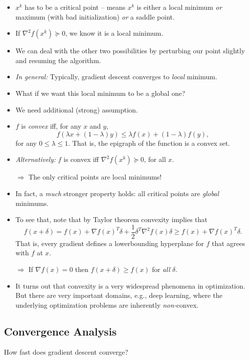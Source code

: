 \documentclass{article}
\begin{document}
\begin{itemize}
\item $x^k$ has to be a critical point -- means $x^k$ is either a local minimum {\em or} maximum (with bad initialization) {\em or} a saddle point. 
\item If $\nabla^2 f(x^k)\succeq 0$, we know it is a local minimum. 
\item We can deal with the other two possibilities by perturbing our point slightly and resuming the algorithm. 
\item {\em In general:} Typically, gradient descent converges to {\em local} minimum. 
\item What if we want this local minimum to be a global one?
\item We need additional (strong) assumption. 
\item $f$ is {\em convex} iff, for any $x$ and $y$, 
\[
f(\lambda x + (1-\lambda) y)\leq \lambda f(x) + (1-\lambda) f(y),
\]
for any $0\leq \lambda \leq 1$. That is, the epigraph of the function is a convex set. 
\item {\em Alternatively:} $f$ is convex iff $\nabla^2 f(x^k)\succeq 0$, for all $x$. 

$\Rightarrow$ The only critical points are local minimums!

\item In fact, a {\em much} stronger property holds: all critical points are {\em global} minimums. 
\item To see that, note that by Taylor theorem convexity implies that
\[
f(x+\delta) = f(x) + \nabla f(x)^T \delta + \frac{1}{2} \delta^T \nabla^2 f(x) \delta \geq f(x) + \nabla f(x)^T \delta.
\]
That is, every gradient defines a lowerbounding hyperplane for $f$ that agrees with $f$ at $x$. 

$\Rightarrow$ If $\nabla f(x)=0$ then $f(x+\delta)\geq f(x)$ for {\em all} $\delta$. 

\item It turns out that convexity is a very widespread phenomena in optimization. But there are very important domains, e.g., deep learning, where the underlying optimization problems are inherently {\em non-}convex.
\end{itemize}

\subsection{Convergence Analysis}

How fast does gradient descent converge?
\end{document}
